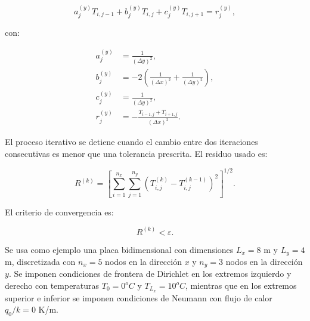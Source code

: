 \documentclass[11pt,a4paper]{article}
\begin{document}
\begin{equation}
a_j^{(y)}T_{i,j-1}+b_j^{(y)}T_{i,j}+c_j^{(y)}T_{i,j+1}=r_j^{(y)},
\end{equation}

con:

\begin{align}
a_j^{(y)} &= \frac{1}{(\Delta y)^2}, \label{eq:coef_tridiagonal_y_2D_a} \\
b_j^{(y)} &= -2\left(\frac{1}{(\Delta x)^2}+\frac{1}{(\Delta y)^2}\right), \label{eq:coef_tridiagonal_y_2D_b} \\
c_j^{(y)} &= \frac{1}{(\Delta y)^2}, \label{eq:coef_tridiagonal_y_2D_c} \\
r_j^{(y)} &= -\frac{T_{i-1,j}+T_{i+1,j}}{(\Delta x)^2}.
\label{eq:coef_tridiagonal_y_2D_r}
\end{align}

El proceso iterativo se detiene cuando el cambio entre dos iteraciones
consecutivas es menor que una tolerancia prescrita. El residuo usado es:

\begin{equation}
R^{(k)}=
\left[
\sum_{i=1}^{n_x}\sum_{j=1}^{n_y}
\left(T_{i,j}^{(k)}-T_{i,j}^{(k-1)}\right)^2
\right]^{1/2}.
\end{equation}

El criterio de convergencia es:

\begin{equation}
R^{(k)}<\varepsilon.
\end{equation}

Se usa como ejemplo una placa bidimensional con dimensiones $L_x=8$ m y 
$L_y=4$ m, discretizada con $n_x=5$ nodos en la direcci\'on $x$ y $n_y=3$ nodos 
en la direcci\'on $y$. Se imponen condiciones de frontera de Dirichlet en los
extremos izquierdo y derecho con temperaturas $T_0=0^{o}C$ y $T_{L_x}=10^{o}C$, 
mientras que en los extremos superior e inferior se imponen condiciones de 
Neumann con flujo de calor $q_0/k= 0$ K/m.
\end{document}
